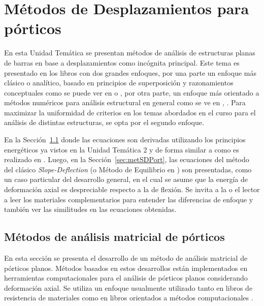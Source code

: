 
\chapter[Métodos de Desplazamientos para pórticos]{Métodos de Desplazamientos para pórticos}

En esta Unidad Temática se presentan métodos de análisis de estructuras planas de barras en base a desplazamientos como incógnita principal. %
%
Este tema es presentado en los libros con dos grandes enfoques, por una parte un enfoque más clásico o analítico, basado en principios de superposición y razonamientos conceptuales como se puede ver en \citep{Timoshenko1940a} o \citep{CerveraRuiz2002ii}, por otra parte, un enfoque más orientado a métodos numéricos para análisis estructural en general como se ve en \citep{Onate2013}, \citep{Pilkey2002,Wunderlich2002}. %
%
Para maximizar la uniformidad de criterios en los temas abordados en el curso para el análisis de distintas estructuras, se opta por el segundo enfoque. %

En la Sección~\ref{sec:analiMatPort} donde las ecuaciones son derivadas utilizando los principios energéticos ya vistos en la Unidad Temática 2 y de forma similar a como es realizado en \citep{Reddy2002b}. %
%
Luego, en la Sección~\ref{sec:metSDPort}, las ecuaciones del método del clásico \textit{Slope-Deflection} (o Método de Equilibrio en \citep{CerveraRuiz2002ii}) son presentadas, como un caso particular del desarrollo general, en el cual se asume que la energía de deformación axial es despreciable respecto a la de flexión. %
%
Se invita a la o el lector a leer los materiales complementarios para entender las diferencias de enfoque y también ver las similitudes en las ecuaciones obtenidas.




\section{Métodos de análisis matricial de pórticos} \label{sec:analiMatPort}

En esta sección se presenta el desarrollo de un método de análisis matricial de pórticos planos. %
%
Métodos basados en estos desarrollos están implementados en herramientas computacionales para el análisis de pórticos planos considerando deformación axial. %
Se utiliza un enfoque usualmente utilizado tanto en libros de resistencia de materiales \citep{Pilkey2002} como en libros orientados a métodos computacionales \citep{Onate2013}. %


